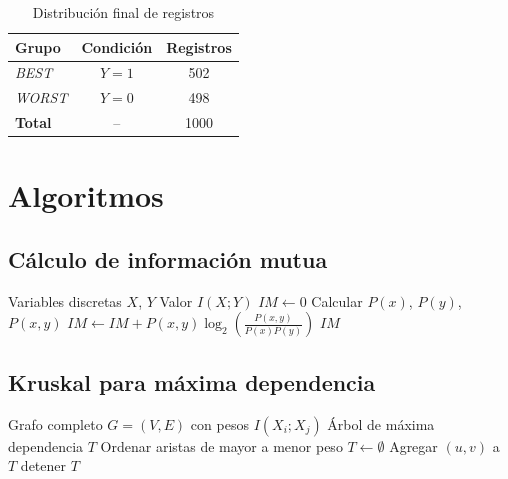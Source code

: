 \documentclass[12pt,a4paper]{article}
\begin{document}
\begin{table}[H]
\centering
\caption{Distribución final de registros}
\label{tab:distribucion}
\begin{tabular}{lcc}
\toprule
\textbf{Grupo} & \textbf{Condición} & \textbf{Registros} \\
\midrule
\textit{BEST} & \(Y=1\) & 502 \\
\textit{WORST} & \(Y=0\) & 498 \\
\textbf{Total} & -- & 1000 \\
\bottomrule
\end{tabular}
\end{table}

\section{Algoritmos}

\subsection{Cálculo de información mutua}

\begin{algorithm}[H]
\caption{Cálculo de información mutua entre dos variables discretas}
\begin{algorithmic}[1]
\Require Variables discretas \(X\), \(Y\)
\Ensure Valor \(I(X;Y)\)
\State \(IM \gets 0\)
        \State Calcular \(P(x)\), \(P(y)\), \(P(x,y)\)
            \State \(IM \gets IM + P(x,y)\log_2\left(\frac{P(x,y)}{P(x)P(y)}\right)\)
        \EndIf
    \EndFor
\EndFor
\State \Return \(IM\)
\end{algorithmic}
\end{algorithm}

\subsection{Kruskal para máxima dependencia}

\begin{algorithm}[H]
\caption{Kruskal para árbol de máxima dependencia}
\begin{algorithmic}[1]
\Require Grafo completo \(G=(V,E)\) con pesos \(I(X_i;X_j)\)
\Ensure Árbol de máxima dependencia \(T\)
\State Ordenar aristas de mayor a menor peso
\State \(T \gets \emptyset\)
        \State Agregar \((u,v)\) a \(T\)
    \EndIf
        \State detener
    \EndIf
\EndFor
\State \Return \(T\)
\end{algorithmic}
\end{algorithm}
\end{document}
